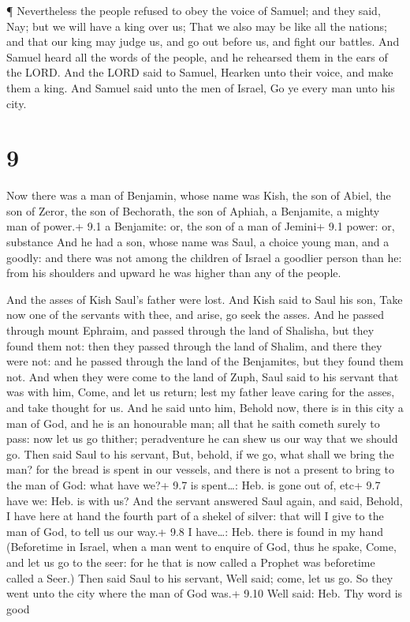  ¶ Nevertheless the people refused to obey the voice of
Samuel; and they said, Nay; but we will have a king over us;
 That we also may be like all the nations; and that our
king may judge us, and go out before us, and fight our battles.
 And Samuel heard all the words of the people, and he
rehearsed them in the ears of the LORD.  And the LORD said
to Samuel, Hearken unto their voice, and make them a king. And Samuel
said unto the men of Israel, Go ye every man unto his city.

\hypertarget{section-8}{%
\section{9}\label{section-8}}

 Now there was a man of Benjamin, whose name was Kish, the
son of Abiel, the son of Zeror, the son of Bechorath, the son of Aphiah,
a Benjamite, a mighty man of power.+ 9.1 a Benjamite: or, the son of a
man of Jemini+ 9.1 power: or, substance  And he had a son,
whose name was Saul, a choice young man, and a goodly: and there was not
among the children of Israel a goodlier person than he: from his
shoulders and upward he was higher than any of the people.

 And the asses of Kish Saul's father were lost. And Kish
said to Saul his son, Take now one of the servants with thee, and arise,
go seek the asses.  And he passed through mount Ephraim, and
passed through the land of Shalisha, but they found them not: then they
passed through the land of Shalim, and there they were not: and he
passed through the land of the Benjamites, but they found them not.
 And when they were come to the land of Zuph, Saul said to
his servant that was with him, Come, and let us return; lest my father
leave caring for the asses, and take thought for us.  And he
said unto him, Behold now, there is in this city a man of God, and he is
an honourable man; all that he saith cometh surely to pass: now let us
go thither; peradventure he can shew us our way that we should go.
 Then said Saul to his servant, But, behold, if we go, what
shall we bring the man? for the bread is spent in our vessels, and there
is not a present to bring to the man of God: what have we?+ 9.7 is
spent\ldots: Heb. is gone out of, etc+ 9.7 have we: Heb. is with us?
 And the servant answered Saul again, and said, Behold, I
have here at hand the fourth part of a shekel of silver: that will I
give to the man of God, to tell us our way.+ 9.8 I have\ldots: Heb.
there is found in my hand  (Beforetime in Israel, when a man
went to enquire of God, thus he spake, Come, and let us go to the seer:
for he that is now called a Prophet was beforetime called a Seer.)
 Then said Saul to his servant, Well said; come, let us go.
So they went unto the city where the man of God was.+ 9.10 Well said:
Heb. Thy word is good

